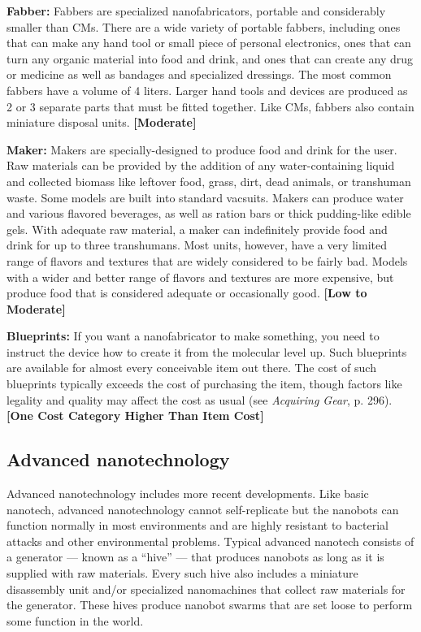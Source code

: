 \textbf{Fabber:} Fabbers are specialized nanofabricators, portable and considerably smaller than CMs. There are a wide variety of portable fabbers, including ones that can make any hand tool or small piece of personal electronics, ones that can turn any organic material into food and drink, and ones that can create any drug or medicine as well as bandages and specialized dressings. The most common fabbers have a volume of 4 liters. Larger hand tools and devices are produced as 2 or 3 separate parts that must be fitted together. Like CMs, fabbers also contain miniature disposal units. \textbf{[Moderate]}

\textbf{Maker:} Makers are specially-designed to produce food and drink for the user. Raw materials can be provided by the addition of any water-containing liquid and collected biomass like leftover food, grass, dirt, dead animals, or transhuman waste. Some models are built into standard vacsuits. Makers can produce water and various flavored beverages, as well as ration bars or thick pudding-like edible gels. With adequate raw material, a maker can indefinitely provide food and drink for up to three transhumans. Most units, however, have a very limited range of flavors and textures that are widely considered to be fairly bad. Models with a wider and better range of flavors and textures are more expensive, but produce food that is considered adequate or occasionally good. \textbf{[Low to Moderate]}

\textbf{Blueprints:} If you want a nanofabricator to make something, you need to instruct the device how to create it from the molecular level up. Such blueprints are available for almost every conceivable item out there. The cost of such blueprints typically exceeds the cost of purchasing the item, though factors like legality and quality may affect the cost as usual (see \emph{Acquiring Gear}, p. 296). \textbf{[One Cost Category Higher Than Item Cost]}


\subsection{Advanced nanotechnology}
\label{sec:advanced-nanotech}

Advanced nanotechnology includes more recent developments. Like basic nanotech, advanced nanotechnology cannot self-replicate but the nanobots can function normally in most environments and are highly resistant to bacterial attacks and other environmental problems. Typical advanced nanotech consists of a generator --- known as a ``hive'' --- that produces nanobots as long as it is supplied with raw materials. Every such hive also includes a miniature disassembly unit and/or specialized nanomachines that collect raw materials for the generator. These hives produce nanobot swarms that are set loose to perform some function in the world.

